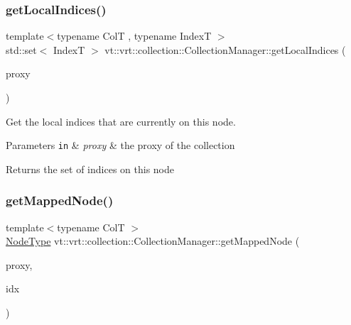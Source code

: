 \subsubsection{\texorpdfstring{get\+Local\+Indices()}{getLocalIndices()}}
{\footnotesize\ttfamily template$<$typename ColT , typename IndexT $>$ \\
std\+::set$<$ IndexT $>$ vt\+::vrt\+::collection\+::\+Collection\+Manager\+::get\+Local\+Indices (\begin{DoxyParamCaption}\item[{\hyperlink{structvt_1_1vrt_1_1collection_1_1_collection_manager_a56458ed7f9bb22b631b9b3a745f42f94}{Collection\+Proxy\+Wrap\+Type}$<$ ColT $>$}]{proxy }\end{DoxyParamCaption})}



Get the local indices that are currently on this node. 


\begin{DoxyParams}[1]{Parameters}
\mbox{\tt in}  & {\em proxy} & the proxy of the collection\\
\hline
\end{DoxyParams}
\begin{DoxyReturn}{Returns}
the set of indices on this node 
\end{DoxyReturn}
\mbox{\label{structvt_1_1vrt_1_1collection_1_1_collection_manager_ab92af61f5466dd4a1210bd6f2f1bb153}} 
\subsubsection{\texorpdfstring{get\+Mapped\+Node()}{getMappedNode()}\hspace{0.1cm}{\footnotesize\ttfamily [1/2]}}
{\footnotesize\ttfamily template$<$typename ColT $>$ \\
\hyperlink{namespacevt_a866da9d0efc19c0a1ce79e9e492f47e2}{Node\+Type} vt\+::vrt\+::collection\+::\+Collection\+Manager\+::get\+Mapped\+Node (\begin{DoxyParamCaption}\item[{\hyperlink{structvt_1_1vrt_1_1collection_1_1_collection_manager_a56458ed7f9bb22b631b9b3a745f42f94}{Collection\+Proxy\+Wrap\+Type}$<$ ColT $>$ const \&}]{proxy,  }\item[{typename Col\+T\+::\+Index\+Type const \&}]{idx }\end{DoxyParamCaption})}



